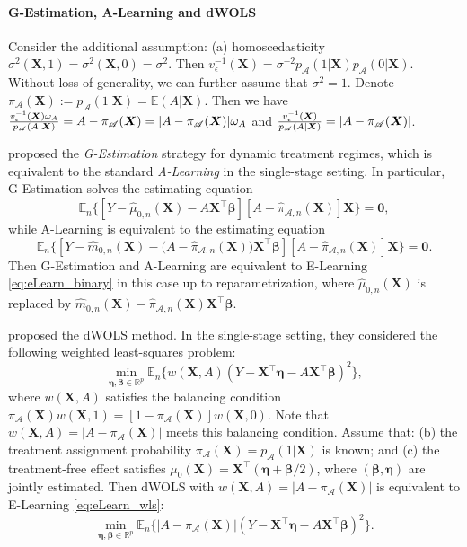 \documentclass[11pt]{article}
\theoremstyle{definition}
\theoremstyle{remark}
\newcommand{\bX}{\bm{X}}
\newcommand{\bbeta}{\bm{\beta}}
\newcommand{\bmeta}{\bm{\eta}}
\newcommand{\bbE}{\mathbb{E}}
\newcommand{\bbR}{\mathbb{R}}
\newcommand{\sA}{\mathscr{A}}
\newcommand{\bzero}{\mathbf{0}}	%
\begin{document}
\paragraph{G-Estimation, A-Learning and dWOLS}
Consider the additional assumption: (a) homoscedasticity $ \sigma^{2}(\bX,1) = \sigma^{2}(\bX,0) = \sigma^{2} $. Then $ v_{\epsilon}^{-1}(\bX) = \sigma^{-2}p_{\sA}(1|\bX)p_{\sA}(0|\bX) $. Without loss of generality, we can further assume that $ \sigma^{2} = 1 $. Denote $ \pi_{\sA}(\bX) := p_{\sA}(1|\bX) = \bbE(A|\bX) $. Then we have $ {v_{\epsilon}^{-1}(\bX)\omega_{A} \over p_{\sA}(A|\bX)} = A - \pi_{\sA}(\bX) = |A - \pi_{\sA}(\bX)|\omega_{A} $ and $ {v_{\epsilon}^{-1}(\bX) \over p_{\sA}(A|\bX)} = |A - \pi_{\sA}(\bX)| $.

\citet{robins2004optimal} proposed the \textit{G-Estimation} strategy for dynamic treatment regimes, which is equivalent to the standard \textit{A-Learning} \citep{murphy2003optimal} in the single-stage setting. In particular, G-Estimation solves the estimating equation
\[ \bbE_{n}\Big\{ \left[Y - \widehat{\mu}_{0,n}(\bX) - A\bX^{\intercal}\bbeta\right]\left[A-\widehat{\pi}_{\sA,n}(\bX)\right]\bX \Big\} = \bzero, \]
while A-Learning is equivalent to the estimating equation
\[ \bbE_{n}\Big\{ \left[Y - \widehat{m}_{0,n}(\bX) - \big(A-\widehat{\pi}_{\sA,n}(\bX)\big)\bX^{\intercal}\bbeta\right]\left[A-\widehat{\pi}_{\sA,n}(\bX)\right]\bX \Big\} = \bzero. \]
Then G-Estimation and A-Learning are  equivalent to E-Learning \eqref{eq:eLearn_binary} in this case up to reparametrization, where $ \widehat{\mu}_{0,n}(\bX) $ is replaced by $ \widehat{m}_{0,n}(\bX) - \widehat{\pi}_{\sA,n}(\bX)\bX^{\intercal}\bbeta $.

\citet{wallace2015doubly} proposed the dWOLS method. In the single-stage setting, they considered the following weighted least-squares problem:
\[ \min_{\bmeta,\bbeta \in \bbR^{p}}\bbE_{n}\Big\{ w(\bX,A)(Y - \bX^{\intercal}\bmeta - A\bX^{\intercal}\bbeta)^{2} \Big\}, \]
where $ w(\bX,A) $ satisfies the balancing condition $ \pi_{\sA}(\bX)w(\bX,1) = [1-\pi_{\sA}(\bX)]w(\bX,0) $. Note that $ w(\bX,A) = |A - \pi_{\sA}(\bX)| $ meets this balancing condition. Assume that: (b) the treatment assignment probability $ \pi_{\sA}(\bX) = p_{\sA}(1|\bX) $ is known; and (c) the treatment-free effect satisfies $ \mu_{0}(\bX) = \bX^{\intercal}(\bmeta + \bbeta/2) $, where $ (\bbeta,\bmeta) $ are jointly estimated. Then dWOLS with $ w(\bX,A) = |A - \pi_{\sA}(\bX)| $ is equivalent to E-Learning \eqref{eq:eLearn_wls}:
\[ \min_{\bmeta,\bbeta \in \bbR^{p}}\bbE_{n}\Big\{ |A-\pi_{\sA}(\bX)|(Y - \bX^{\intercal}\bmeta - A \bX^{\intercal}\bbeta)^{2} \Big\}. \]
\end{document}
